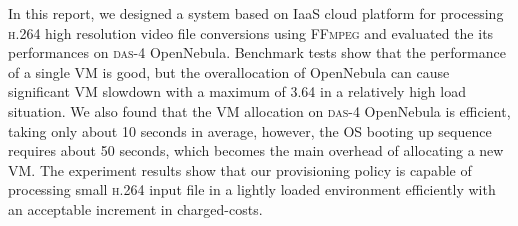 
In this report, we designed a system based on IaaS cloud platform for
processing \textsc{h.264} high resolution video file conversions using
\textsc{FFmpeg} and evaluated the its performances on \textsc{das-4}
OpenNebula. Benchmark tests show that the performance of a single VM
is good, but the overallocation of OpenNebula can cause significant
VM slowdown with a maximum of 3.64 in a relatively high load situation.
We also found that the VM allocation on \textsc{das-4} OpenNebula is
efficient, taking only about 10 seconds in average, however, the OS
booting up sequence requires about 50 seconds, which becomes the main
overhead of allocating a new VM.
The experiment results show that our \policysimpleelastic{}
provisioning policy is capable of processing small \textsc{h.264} input
file in a lightly loaded environment efficiently with an acceptable
increment in charged-costs.


